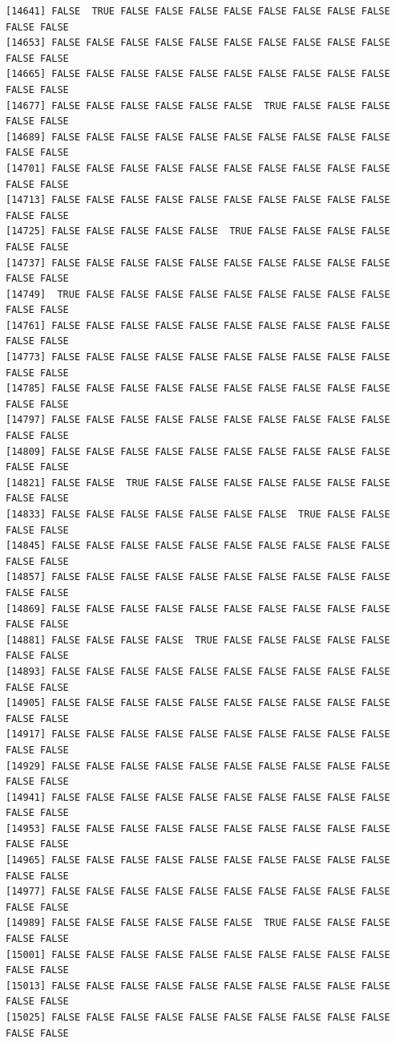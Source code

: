 \documentclass[
  a4paper,
  DIV=11,
  numbers=noendperiod]{scrartcl}
\begin{document}
\begin{verbatim}
[14641] FALSE  TRUE FALSE FALSE FALSE FALSE FALSE FALSE FALSE FALSE FALSE FALSE
[14653] FALSE FALSE FALSE FALSE FALSE FALSE FALSE FALSE FALSE FALSE FALSE FALSE
[14665] FALSE FALSE FALSE FALSE FALSE FALSE FALSE FALSE FALSE FALSE FALSE FALSE
[14677] FALSE FALSE FALSE FALSE FALSE FALSE  TRUE FALSE FALSE FALSE FALSE FALSE
[14689] FALSE FALSE FALSE FALSE FALSE FALSE FALSE FALSE FALSE FALSE FALSE FALSE
[14701] FALSE FALSE FALSE FALSE FALSE FALSE FALSE FALSE FALSE FALSE FALSE FALSE
[14713] FALSE FALSE FALSE FALSE FALSE FALSE FALSE FALSE FALSE FALSE FALSE FALSE
[14725] FALSE FALSE FALSE FALSE FALSE  TRUE FALSE FALSE FALSE FALSE FALSE FALSE
[14737] FALSE FALSE FALSE FALSE FALSE FALSE FALSE FALSE FALSE FALSE FALSE FALSE
[14749]  TRUE FALSE FALSE FALSE FALSE FALSE FALSE FALSE FALSE FALSE FALSE FALSE
[14761] FALSE FALSE FALSE FALSE FALSE FALSE FALSE FALSE FALSE FALSE FALSE FALSE
[14773] FALSE FALSE FALSE FALSE FALSE FALSE FALSE FALSE FALSE FALSE FALSE FALSE
[14785] FALSE FALSE FALSE FALSE FALSE FALSE FALSE FALSE FALSE FALSE FALSE FALSE
[14797] FALSE FALSE FALSE FALSE FALSE FALSE FALSE FALSE FALSE FALSE FALSE FALSE
[14809] FALSE FALSE FALSE FALSE FALSE FALSE FALSE FALSE FALSE FALSE FALSE FALSE
[14821] FALSE FALSE  TRUE FALSE FALSE FALSE FALSE FALSE FALSE FALSE FALSE FALSE
[14833] FALSE FALSE FALSE FALSE FALSE FALSE FALSE  TRUE FALSE FALSE FALSE FALSE
[14845] FALSE FALSE FALSE FALSE FALSE FALSE FALSE FALSE FALSE FALSE FALSE FALSE
[14857] FALSE FALSE FALSE FALSE FALSE FALSE FALSE FALSE FALSE FALSE FALSE FALSE
[14869] FALSE FALSE FALSE FALSE FALSE FALSE FALSE FALSE FALSE FALSE FALSE FALSE
[14881] FALSE FALSE FALSE FALSE  TRUE FALSE FALSE FALSE FALSE FALSE FALSE FALSE
[14893] FALSE FALSE FALSE FALSE FALSE FALSE FALSE FALSE FALSE FALSE FALSE FALSE
[14905] FALSE FALSE FALSE FALSE FALSE FALSE FALSE FALSE FALSE FALSE FALSE FALSE
[14917] FALSE FALSE FALSE FALSE FALSE FALSE FALSE FALSE FALSE FALSE FALSE FALSE
[14929] FALSE FALSE FALSE FALSE FALSE FALSE FALSE FALSE FALSE FALSE FALSE FALSE
[14941] FALSE FALSE FALSE FALSE FALSE FALSE FALSE FALSE FALSE FALSE FALSE FALSE
[14953] FALSE FALSE FALSE FALSE FALSE FALSE FALSE FALSE FALSE FALSE FALSE FALSE
[14965] FALSE FALSE FALSE FALSE FALSE FALSE FALSE FALSE FALSE FALSE FALSE FALSE
[14977] FALSE FALSE FALSE FALSE FALSE FALSE FALSE FALSE FALSE FALSE FALSE FALSE
[14989] FALSE FALSE FALSE FALSE FALSE FALSE  TRUE FALSE FALSE FALSE FALSE FALSE
[15001] FALSE FALSE FALSE FALSE FALSE FALSE FALSE FALSE FALSE FALSE FALSE FALSE
[15013] FALSE FALSE FALSE FALSE FALSE FALSE FALSE FALSE FALSE FALSE FALSE FALSE
[15025] FALSE FALSE FALSE FALSE FALSE FALSE FALSE FALSE FALSE FALSE FALSE FALSE

\end{verbatim}
\end{document}
